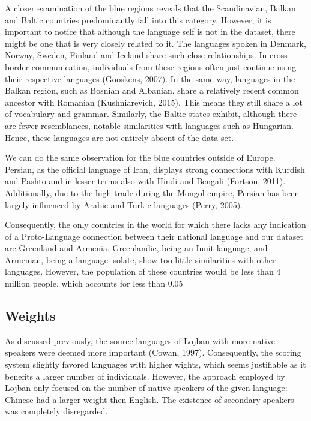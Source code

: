\vspace{0.3cm}

\noindent

A closer examination of the blue regions reveals that the Scandinavian, Balkan and Baltic countries predominantly fall into this category. However, it is important to notice that although the language self is not in the dataset, there might be one that is very closely related to it. The languages spoken in Denmark, Norway, Sweden, Finland and Iceland share such close relationships. In cross-border communication, individuals from these regions often just continue using their respective languages (Gooskens, 2007). In the same way, languages in the Balkan region, such as Bosnian and Albanian, share a relatively recent common ancestor with Romanian (Kushniarevich, 2015). This means they still share a lot of vocabulary and grammar. Similarly, the Baltic states exhibit, although there are fewer resemblances, notable similarities with languages such as Hungarian. Hence, these languages are not entirely absent of the data set.

We can do the same observation for the blue countries outside of Europe. Persian, as the official language of Iran, displays strong connections with Kurdish and Pashto and in lesser terms also with Hindi and Bengali (Fortson, 2011). Additionally, due to the high trade during the Mongol empire, Persian has been largely influenced by Arabic and Turkic languages (Perry, 2005). 

Consequently, the only countries in the world for which there lacks any indication of a Proto-Language connection between their national language and our dataset are Greenland and Armenia. Greenlandic, being an Inuit-language, and Armenian, being a language isolate, show too little similarities with other languages. However, the population of these countries would be less than 4 million people, which accounts for less than 0.05%

\subsection{Weights}

As discussed previously, the source languages of Lojban with more native speakers were deemed more important (Cowan, 1997). Consequently, the scoring system slightly favored languages with higher wights, which seems justifiable as it benefits a larger number of individuals. However, the approach employed by Lojban only focused on the number of native speakers of the given language: Chinese had a larger weight then English. The existence of secondary speakers was completely disregarded. 

